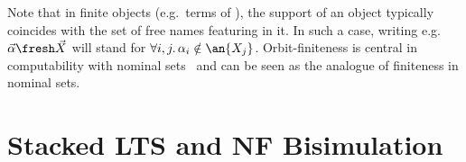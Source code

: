 Note that in finite objects (e.g.\ terms of \lang), the support of an object typically coincides with the set of free names featuring in it. In such a case, writing e.g.\ $\vec\alpha\fresh \vec X$ will stand for $\forall i,j.\,\alpha_i\notin\an{X_j}$.
Orbit-finiteness is central in computability with nominal sets~\cite{BojanczykKLT13,BojanczykKL14} and can be seen as the analogue of finiteness in nominal sets.




  \section{Stacked LTS and NF Bisimulation}
  \label{sec:lts}
\newcommand{\realtrans}[2][]{\xmapsto[#1]{#2}}
\newcommand\hsig[1]{\mathsf{sig}(#1)}
\renewcommand{\conf}[5]{\ma{\langle #2 \mathop{;} #3 \mathop{;} #4 \mathop{;} #5\rangle}}
\renewcommand{\oldpconf}[5]
{\ma{\color{blue}\langle\color{black} #2 \mathop{;} #3 \mathop{;} #4 \mathop{;} #5 \color{blue}\rangle\color{black}}
}
\renewcommand{\oldoconf}[5]
{\ma{{\color{red}\langle} #2 \mathop{;} {#3} \mathop{;} #4  \mathop{;} #5 {\color{red}\rangle}}
}
\renewcommand{\pconf}[4]
{\ma{\color{blue}\llparenthesis\color{black} #2 \mathop{;} #3 \mathop{;} #4 \color{blue}\rrparenthesis\color{black}}
}
\renewcommand{\oconf}[4]
{\ma{\color{red}\llparenthesis\color{black} #2 \mathop{;} {#3} \mathop{;} #4 \color{red}\rrparenthesis\color{black}}
}

